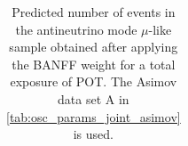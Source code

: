 \begin{table}
\begin{tabular} { | l ||r | r | r | r | r | r | | r | }
\end{tabular}
\caption{
Predicted number of events in the antineutrino mode $\mu$-like sample
obtained after applying the BANFF weight
for a total exposure of \TotalPotNuBarRunOneSevenC{} POT.
The Asimov data set A in \cref{tab:osc_params_joint_asimov} is used.
}
\label{tab:events_rhc1rmu_Asimov_A_Run17c}
\end{table}


